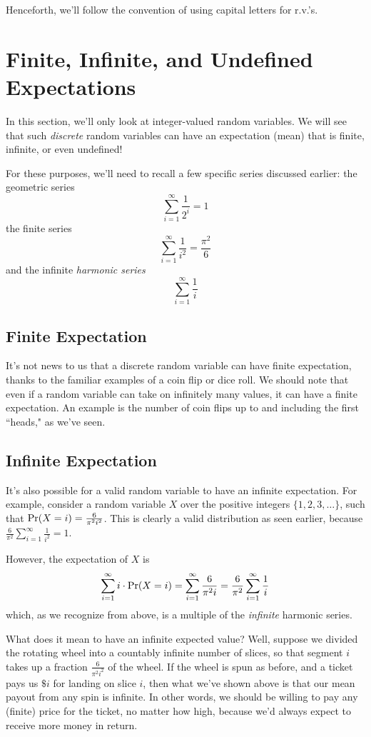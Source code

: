 Henceforth, we'll follow the convention of using capital letters for r.v.'s.




\section{Finite, Infinite, and Undefined Expectations}

In this section, we'll only look at integer-valued random variables. 
We will see that such \emph{discrete} random variables can have an expectation (mean) 
that is finite, infinite, or even undefined!

For these purposes, we'll need to recall a few specific series discussed earlier: 
the geometric series
$$ \sum_{i=1}^\infty \frac{1}{2^i} = 1 $$
the finite series
$$ \sum_{i=1}^\infty \frac{1}{i^2} = \frac{\pi^2}{6} $$
and the infinite \emph{harmonic series}
$$ \sum_{i=1}^\infty \frac{1}{i} $$

\subsection{Finite Expectation}
It's not news to us that a discrete random variable can have finite expectation, 
thanks to the familiar examples of a coin flip or dice roll. 
We should note that even if a random variable can take on infinitely many values, it can have a finite expectation.
An example is the number of coin flips up to and including the first ``heads," as we've seen.


\subsection{Infinite Expectation}
It's also possible for a valid random variable to have an infinite expectation. 
For example, consider a random variable $X$ over the positive integers $\{1, 2, 3, \dots\}$, 
such that $\mbox{\rm Pr}(X = i) = \frac{6}{\pi^2 i^2}$. 
This is clearly a valid distribution as seen earlier, because $ \frac{6}{\pi^2} \sum_{i=1}^\infty \frac{1}{i^2} = 1 $. 

However, the expectation of $X$ is
$$ \sum_{i=1}^\infty i \cdot \mbox{\rm Pr}(X = i) = \sum_{i=1}^\infty \frac{6}{\pi^2 i} = \frac{6}{\pi^2} \sum_{i=1}^\infty \frac{1}{i} $$
which, as we recognize from above, is a multiple of the \emph{infinite} harmonic series. 

What does it mean to have an infinite expected value? 
Well, suppose we divided the rotating wheel into a countably infinite number of slices, 
so that segment $i$ takes up a fraction $\frac{6}{\pi^2 i^2}$ of the wheel. 
If the wheel is spun as before, and a ticket pays us $\$i$ for landing on slice $i$, 
then what we've shown above is that our mean payout from any spin is infinite. 
In other words, we should be willing to pay any (finite) price for the ticket, no matter how high, 
because we'd always expect to receive more money in return.


